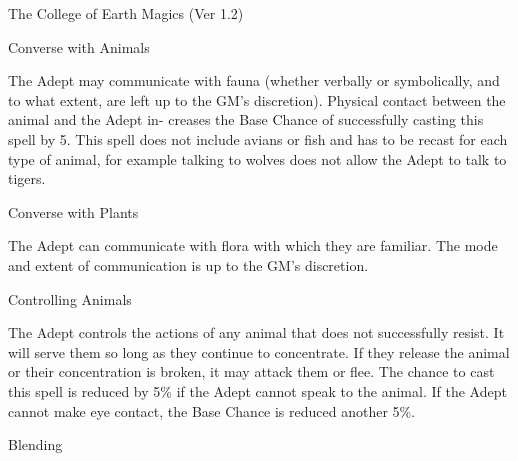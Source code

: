 \begin{Chapter}{The College of Earth Magics (Ver 1.2)}
\begin{spell}[G-1]{Converse with Animals }

\begin{effects}
 The  Adept  may  communicate  with  fauna 
(whether  verbally  or  symbolically,  and  to  what 
extent, are left up to the GM’s discretion). Physical 
contact  between  the  animal  and  the  Adept  in-
creases  the  Base  Chance  of  successfully  casting 
this  spell  by  5.  This  spell  does  not  include  avians 
or fish and has to be recast for each type of animal, 
for  example  talking  to  wolves  does  not  allow  the 
Adept to talk to tigers. 

\end{effects}
\end{spell}

\begin{spell}[G-2]{Converse with Plants }

\begin{effects}
 The  Adept  can  communicate  with  flora 
with which they are familiar. The mode and extent 
of communication is up to the GM’s discretion. 

\end{effects}
\end{spell}

\begin{spell}[G-3]{Controlling Animals }

\begin{effects}
 The  Adept  controls  the  actions  of  any 
animal  that  does  not  successfully  resist.  It  will 
serve them so long as they continue to concentrate. 
If  they  release  the  animal  or  their  concentration  is 
broken,  it  may  attack  them  or  flee.  The  chance  to 
cast this spell is reduced by 5\% if the Adept cannot 
speak to the animal. If the Adept cannot make eye 
contact, the Base Chance is reduced another 5\%. 

\end{effects}
\end{spell}

\begin{spell}[G-4]{Blending }


\end{spell}
\end{Chapter}
